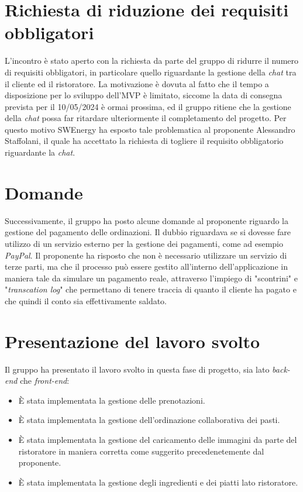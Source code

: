 \section{Richiesta di riduzione dei requisiti obbligatori }

L'incontro è stato aperto con la richiesta da parte del gruppo di ridurre il 
numero di requisiti obbligatori, in particolare quello riguardante la gestione 
della \textit{chat} tra il cliente ed il ristoratore.
La motivazione è dovuta al fatto che il tempo a disposizione per lo sviluppo 
dell'MVP è limitato, siccome la data di consegna prevista per il 10/05/2024 è 
ormai prossima, ed il gruppo ritiene che la gestione della \textit{chat} possa 
far ritardare ulteriormente il completamento del progetto.
Per questo motivo SWEnergy ha esposto tale problematica al proponente Alessandro 
Staffolani, il quale ha accettato la richiesta di togliere il requisito 
obbligatorio riguardante la \textit{chat}.

\section{Domande}
Successivamente, il gruppo ha posto alcune domande al proponente riguardo la 
gestione del pagamento delle ordinazioni. 
Il dubbio riguardava se si dovesse fare utilizzo di un servizio esterno per la 
gestione dei pagamenti, come ad esempio \textit{PayPal}. 
Il proponente ha risposto che non è necessario utilizzare un servizio di terze 
parti, ma che il processo può essere gestito all'interno dell'applicazione in 
maniera tale da simulare un pagamento reale, attraverso l'impiego di "scontrini" 
e "\textit{transcation log}" che permettano di tenere traccia di quanto il 
cliente ha pagato e che quindi il conto sia effettivamente saldato.  


\section{Presentazione del lavoro svolto}
Il gruppo ha presentato il lavoro svolto in questa fase di progetto, sia lato 
\textit{back-end} che \textit{front-end}:
\begin{itemize}
    \item È stata implementata la gestione delle prenotazioni.
    \item È stata implementata la gestione dell'ordinazione collaborativa dei 
		pasti.
    \item È stata implementata la gestione del caricamento delle immagini da 
		parte del ristoratore in maniera corretta come suggerito 
		precedenetemente dal proponente.
    \item È stata implementata la gestione degli ingredienti e dei piatti lato 
		ristoratore.
\end{itemize}

